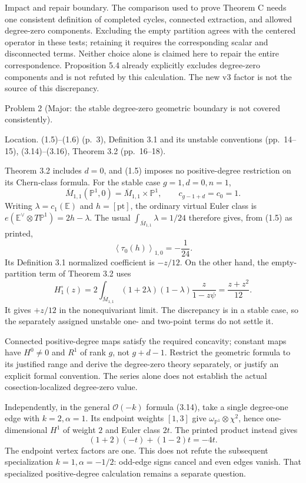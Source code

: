 \documentclass[10pt]{article}
\begin{document}
Impact and repair boundary. The comparison used to prove Theorem C needs one consistent definition of completed cycles, connected extraction, and allowed degree-zero components. Excluding the empty partition agrees with the centered operator in these tests; retaining it requires the corresponding scalar and disconnected terms. Neither choice alone is claimed here to repair the entire correspondence. Proposition 5.4 already explicitly excludes degree-zero components and is not refuted by this calculation. The new v3 factor is not the source of this discrepancy.\par
Problem 2 (Major: the stable degree-zero geometric boundary is not covered consistently).\par
Location. (1.5)–(1.6) (p. 3), Definition 3.1 and its unstable conventions (pp. 14–15), (3.14)–(3.16), Theorem 3.2 (pp. 16–18).\par
Theorem 3.2 includes \(d=0\), and (1.5) imposes no positive-degree restriction on its Chern-class formula. For the stable case \(g=1,d=0,n=1\), \[\overline M_{1,1}(\mathbb P^1,0)=\overline M_{1,1}\times\mathbb P^1,
 \qquad c_{g-1+d}=c_0=1.\] Writing \(\lambda=c_1(\mathbb E)\) and \(h=[\mathrm{pt}]\), the ordinary virtual Euler class is \(e(\mathbb E^\vee\otimes T\mathbb P^1)=2h-\lambda\). The usual \(\int_{\overline M_{1,1}}\lambda=1/24\) therefore gives, from (1.5) as printed, \[\left\langle \tau_0(h)\right\rangle_{1,0}=-\frac1{24}.\] Its Definition 3.1 normalized coefficient is \(-z/12\). On the other hand, the empty-partition term of Theorem 3.2 uses \[H_1^\circ(z)
 =2\int_{\overline M_{1,1}}
 (1+2\lambda)(1-\lambda)\frac{z}{1-z\psi}
 =\frac{z+z^2}{12}.\] It gives \(+z/12\) in the nonequivariant limit. The discrepancy is in a stable case, so the separately assigned unstable one- and two-point terms do not settle it.\par
Connected positive-degree maps satisfy the required concavity; constant maps have \(H^0\neq0\) and \(R^1\) of rank \(g\), not \(g+d-1\). Restrict the geometric formula to its justified range and derive the degree-zero theory separately, or justify an explicit formal convention. The series alone does not establish the actual cosection-localized degree-zero value.\par
Independently, in the general \(\mathcal O(-k)\) formula (3.14), take a single degree-one edge with \(k=2,\alpha=1\). Its endpoint weights \([1,3]\) give \(\omega_{\mathbb P^1}\otimes\chi^2\), hence one-dimensional \(H^1\) of weight \(2\) and Euler class \(2t\). The printed product instead gives \[(1+2)(-t)+(1-2)t=-4t.\] The endpoint vertex factors are one. This does not refute the subsequent specialization \(k=1,\alpha=-1/2\): odd-edge signs cancel and even edges vanish. That specialized positive-degree calculation remains a separate question.\par
\end{document}
